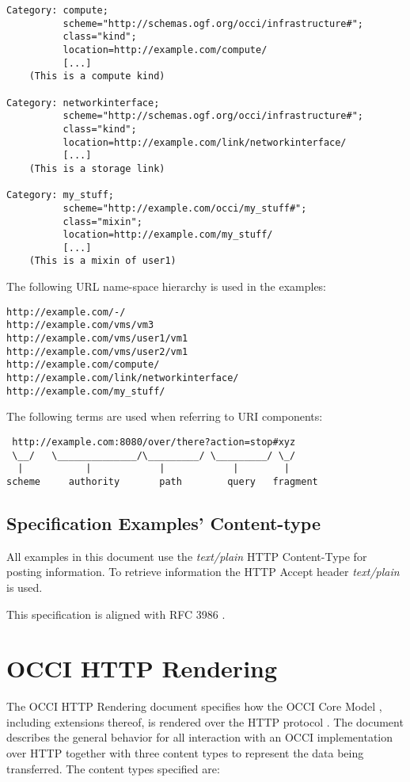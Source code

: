 \documentclass[10pt,a4paper]{article}
\begin{document}
\begin{verbatim}
Category: compute;
          scheme="http://schemas.ogf.org/occi/infrastructure#";
          class="kind";
          location=http://example.com/compute/
          [...]
    (This is a compute kind)

Category: networkinterface;
          scheme="http://schemas.ogf.org/occi/infrastructure#";
          class="kind";
          location=http://example.com/link/networkinterface/
          [...]
    (This is a storage link)

Category: my_stuff;
          scheme="http://example.com/occi/my_stuff#";
          class="mixin";
          location=http://example.com/my_stuff/
          [...]
    (This is a mixin of user1)
\end{verbatim}
The following URL name-space hierarchy is used in the examples:
\begin{verbatim}
http://example.com/-/
http://example.com/vms/vm3
http://example.com/vms/user1/vm1
http://example.com/vms/user2/vm1
http://example.com/compute/
http://example.com/link/networkinterface/
http://example.com/my_stuff/
\end{verbatim}

The following terms \cite{rfc3986} are used when referring to URI
components:

\begin{verbatim}
 http://example.com:8080/over/there?action=stop#xyz
 \__/   \______________/\_________/ \_________/ \_/
  |           |            |            |        |
scheme     authority       path        query   fragment
\end{verbatim}

\subsection{Specification Examples' Content-type}
All examples in this document use the \emph{text/plain} HTTP
Content-Type for posting information. To retrieve information the HTTP
Accept header \emph{text/plain} is used.

This specification is aligned with RFC 3986 \cite{rfc3986}.

\section{OCCI HTTP Rendering}
The OCCI HTTP Rendering document specifies how the OCCI Core Model
\cite{occi:core}, including extensions thereof, is rendered over the
HTTP protocol \cite{rfc2616}. The document describes the general
behavior for all interaction with an OCCI implementation over HTTP
together with three content types to represent the data being
transferred. The content types specified are: 
\end{document}
